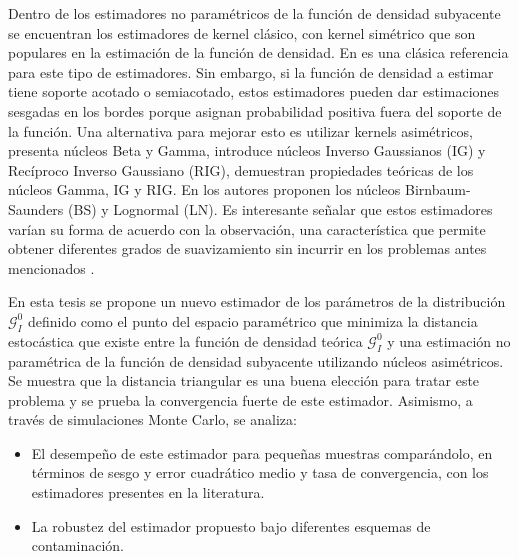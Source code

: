 Dentro de los estimadores no paramétricos de la función de densidad subyacente se encuentran los estimadores de kernel clásico, con kernel simétrico que son populares en la estimación de la función de densidad. En \citet{Silverman1986} es una clásica referencia para este tipo de estimadores.
Sin embargo, si la función de densidad a estimar tiene soporte acotado o semiacotado, estos estimadores pueden dar estimaciones sesgadas en los bordes porque asignan probabilidad positiva fuera del soporte de la función. Una alternativa para mejorar esto es utilizar kernels asimétricos, \citet{chen1999, chensx2000} presenta núcleos Beta y Gamma, \citet {Scaillet2004} introduce núcleos Inverso Gaussianos (IG) y Recíproco Inverso Gaussiano (RIG), \citet {bouezmarni2005} demuestran propiedades teóricas de los núcleos Gamma, IG y RIG. En \citet{Jin2003} los autores proponen los núcleos Birnbaum-Saunders (BS) y Lognormal (LN). Es interesante señalar que  estos estimadores varían su forma de acuerdo con la observación, una característica que permite obtener diferentes grados de suavizamiento sin incurrir en los problemas antes mencionados \citet{Scaillet2004}. 

En esta tesis se propone un nuevo  estimador de los parámetros de la distribución $\mathcal{G}_I^0$ definido como el punto del espacio paramétrico que minimiza la distancia estocástica que existe entre la función de densidad teórica $\mathcal{G}_I^0$ y una estimación no paramétrica de la función de densidad subyacente utilizando núcleos asimétricos. Se muestra que la distancia triangular es una buena elección para tratar este problema y se prueba la convergencia fuerte de este estimador. Asimismo, a través de simulaciones Monte Carlo, se analiza:
\begin{itemize}
	\item El desempeño de este estimador para pequeñas muestras comparándolo, en términos de sesgo y error cuadrático medio y tasa de convergencia, con los estimadores presentes en la literatura.
	\item La robustez del estimador propuesto bajo diferentes esquemas de contaminación.
\end{itemize}  

